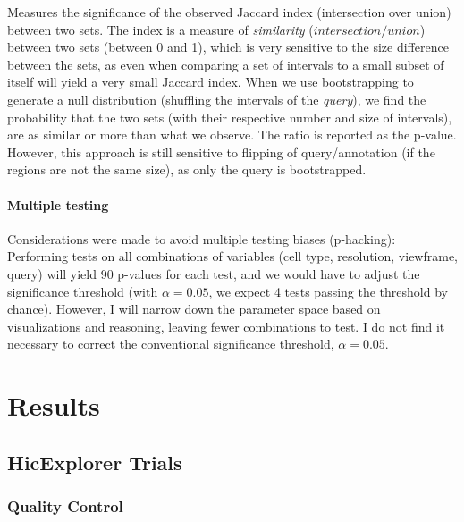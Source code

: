 \documentclass[
  11pt,
  a4paper,
]{scrbook}
\begin{document}
Measures the significance of the observed Jaccard index (intersection
over union) between two sets. The index is a measure of
\emph{similarity} (\(intersection/union\)) between two sets (between 0
and 1), which is very sensitive to the size difference between the sets,
as even when comparing a set of intervals to a small subset of itself
will yield a very small Jaccard index. When we use bootstrapping to
generate a null distribution (shuffling the intervals of the
\emph{query}), we find the probability that the two sets (with their
respective number and size of intervals), are as similar or more than
what we observe. The ratio is reported as the p-value. However, this
approach is still sensitive to flipping of query/annotation (if the
regions are not the same size), as only the query is bootstrapped.

\subsubsection{Multiple testing}\label{multiple-testing}

Considerations were made to avoid multiple testing biases (p-hacking):
Performing tests on all combinations of variables (cell type,
resolution, viewframe, query) will yield 90 p-values for each test, and
we would have to adjust the significance threshold (with
\(\alpha = 0.05\), we expect 4 tests passing the threshold by chance).
However, I will narrow down the parameter space based on visualizations
and reasoning, leaving fewer combinations to test. I do not find it
necessary to correct the conventional significance threshold,
\(\alpha=0.05\).

\chapter{Results}\label{results}

\section{HicExplorer Trials}\label{hicexplorer-trials-1}

\subsection{Quality Control}\label{quality-control}
\end{document}
